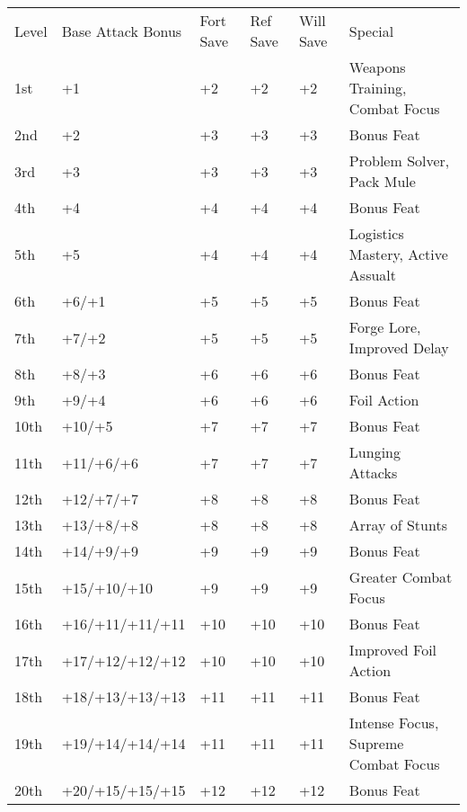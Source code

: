 




\begin{table}[tbh]
\begin{small}
\begin{tabular}{lp{3cm}p{0.7cm}p{0.7cm}p{0.7cm}l}
Level  &Base Attack Bonus &Fort Save &Ref Save &Will Save &Special\\
1st &+1 &+2 &+2 &+2 &Weapons Training, Combat Focus\\
2nd &+2 &+3 &+3 &+3 &Bonus Feat\\
3rd &+3 &+3 &+3 &+3 &Problem Solver, Pack Mule\\
4th &+4 &+4 &+4 &+4 &Bonus Feat\\
5th &+5 &+4 &+4 &+4 &Logistics Mastery, Active Assualt\\
6th &+6/+1 &+5 &+5 &+5 &Bonus Feat\\
7th &+7/+2 &+5 &+5 &+5 &Forge Lore, Improved Delay\\
8th &+8/+3 &+6 &+6 &+6 &Bonus Feat\\
9th &+9/+4 &+6 &+6 &+6 &Foil Action\\
10th &+10/+5 &+7 &+7 &+7 &Bonus Feat\\
11th &+11/+6/+6 &+7 &+7 &+7 &Lunging Attacks\\
12th &+12/+7/+7 &+8 &+8 &+8 &Bonus Feat\\
13th &+13/+8/+8 &+8 &+8 &+8 &Array of Stunts\\
14th &+14/+9/+9 &+9 &+9 &+9 &Bonus Feat\\
15th &+15/+10/+10 &+9 &+9 &+9 &Greater Combat Focus\\
16th &+16/+11/+11/+11 &+10 &+10 &+10 &Bonus Feat\\
17th &+17/+12/+12/+12 &+10 &+10 &+10 &Improved Foil Action\\
18th &+18/+13/+13/+13 &+11 &+11 &+11 &Bonus Feat\\
19th &+19/+14/+14/+14 &+11 &+11 &+11 &Intense Focus, Supreme Combat Focus\\
20th &+20/+15/+15/+15 &+12 &+12 &+12 &Bonus Feat\\
\end{tabular}
\end{small}
\end{table}

